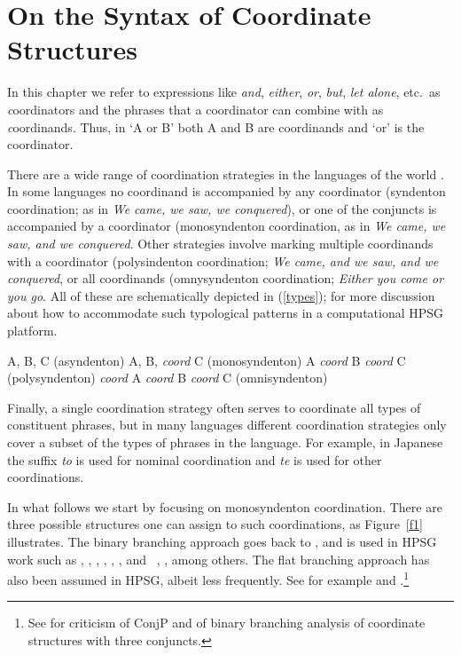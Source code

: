 \documentclass[output=paper]{langsci/langscibook}
\begin{document}
\section{On the Syntax of Coordinate Structures}

In this chapter we refer to expressions like \emph{and}, \emph{either},  \emph{or}, \emph{but}, 
\emph{let alone}, etc.\ as {\emph coordinators}  and the phrases that a coordinator can combine with as  {\emph coordinands}. 
Thus,  in `A or B' both A and B are coordinands and `or' is the coordinator. 

There are a wide range of coordination strategies in the languages of the world \citet{haspelmath}. In some languages no coordinand is accompanied by any coordinator (syndenton coordination; as in \emph{We came, we saw, we conquered}), or one of the conjuncts is accompanied by a coordinator (monosyndenton coordination,  as in \emph{We came, we saw, and we conquered}. Other strategies involve marking multiple coordinands with a coordinator (polysindenton coordination;
\emph{We came, and we saw, and we conquered}, or all coordinands (omnysyndenton coordination;
\emph{Either you come or you go}.
All of these are schematically depicted in (\ref{types});
 \citet{Drellishak:Bender:05} for more discussion about how to accommodate such typological patterns in a computational HPSG platform.

\begin{exe}
\ex
\begin{xlista}
\ex A, B, C \hfill (asyndenton)
\ex A, B, \emph{coord} C \hfill (monosyndenton)
\ex A \emph{coord} B \emph{coord} C \hfill (polysyndenton)
\ex \emph{coord} A \emph{coord} B \emph{coord} C \hfill (omnisyndenton)
\end{xlista}\label{types}
\end{exe}



\noindent
 Finally, a single coordination strategy often serves to coordinate all types of constituent phrases, but in many languages different coordination strategies only cover a subset of the types of phrases in the language. For example, in
Japanese the suffix \emph{to} is used for nominal coordination
and \emph{te} is used for other coordinations.

In what follows we start by focusing on monosyndenton coordination. There are three possible structures one can assign to such coordinations, as Figure~\ref{f1} illustrates. The binary branching approach goes back to \citet{yngve}, and is used in HPSG work such as
\citet{pollardsag}, \citet{Yatabe:03}, \citet{berthold03},
\citet{Beavers}, \citet{Drellishak:Bender:05}, \citet{Abeille:05}, and
\ \citet{chavesthesis}, \citet{chavesextr}, among others. The flat branching approach has also been  assumed in HPSG, albeit less frequently. See for example
 \citet{sagwasowbender} and  \citet{Sag:03}.\footnote{See \citet{Borsley:05} for criticism of 
ConjP and of binary branching analysis of coordinate structures with three conjuncts.}
\end{document}
